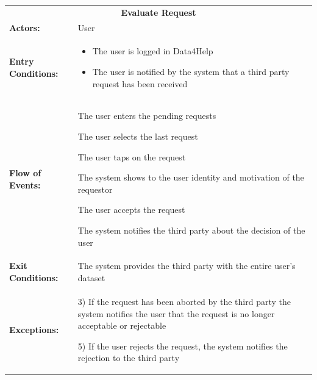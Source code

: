 \begin{table}[H]
	\centering
	{\renewcommand{\arraystretch}{1.5}%
		\begin{tabular}{|@{\hspace{2em}} p{4cm} @{}| p{11cm} @{\qquad}|}
			\cline{1-2}
			\multicolumn{2}{|c|}{\textbf{Evaluate Request}} \\ \cline{1-2}
			\textbf{Actors:} & User \\ \cline{1-2}
			\textbf{Entry Conditions:} & \begin{itemize}[itemsep=-0.2em, topsep=0em]
				\item The user is logged in Data4Help
				\item The user is notified by the system that a third party request has been received
			\end{itemize} \\ \cline{1-2}
			\textbf{Flow of Events:} & \begin{enumerate}[itemsep=-0.2em, topsep=0em]
			{\small	\item The user enters the pending requests
				\item The user selects the last request
				\item The user taps on the request 
				\item The system shows to the user identity and motivation of the requestor
				\item The user accepts the request
				\item The system notifies the third party about the decision of the user}
			\end{enumerate} \\ \cline{1-2}
			\textbf{Exit Conditions:} & The system provides the third party with the entire user's dataset\\ \cline{1-2}
			\textbf{Exceptions:} & 
			\begin{itemize}[itemsep=-0.2em, topsep=0em]
				{\small \item 3) If the request has been aborted by the third party the system notifies the user that the request is no longer acceptable or rejectable
				\item 5) If the user rejects the request, the system notifies the rejection to the third party}
			\end{itemize} \\ \cline{1-2}
	\end{tabular}} \quad
\end{table}

